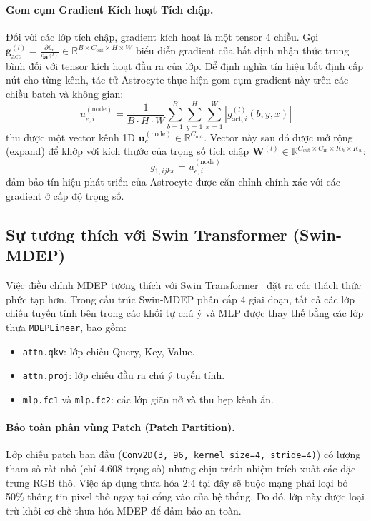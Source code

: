 \documentclass[11pt, a4paper]{article}
\newcommand{\R}{\mathbb{R}}
\begin{document}
\paragraph{Gom cụm Gradient Kích hoạt Tích chập.}
Đối với các lớp tích chập, gradient kích hoạt là một tensor 4 chiều. Gọi $\bm{g}_{\text{act}}^{(l)} = \frac{\partial \bar{u}_e}{\partial \bm{a}^{(l)}} \in \R^{B \times C_{\text{out}} \times H \times W}$ biểu diễn gradient của bất định nhận thức trung bình đối với tensor kích hoạt đầu ra của lớp. Để định nghĩa tín hiệu bất định cấp nút cho từng kênh, tác tử Astrocyte thực hiện gom cụm gradient này trên các chiều batch và không gian:
\begin{equation}\label{eq:conv_pooling}
    u_{e,i}^{(\text{node})} = \frac{1}{B \cdot H \cdot W} \sum_{b=1}^B \sum_{y=1}^H \sum_{x=1}^W \left| g_{\text{act}, i}^{(l)}(b, y, x) \right|
\end{equation}
thu được một vector kênh 1D $\bm{u}_e^{(\text{node})} \in \R^{C_{\text{out}}}$. Vector này sau đó được mở rộng (expand) để khớp với kích thước của trọng số tích chập $\bm{W}^{(l)} \in \R^{C_{\text{out}} \times C_{\text{in}} \times K_h \times K_w}$:
\begin{equation}
    g_{1, ijkx} = u_{e,i}^{(\text{node})}
\end{equation}
đảm bảo tín hiệu phát triển của Astrocyte được căn chỉnh chính xác với các gradient ở cấp độ trọng số.

\subsection{Sự tương thích với Swin Transformer (Swin-MDEP)}\label{subsec:swin}

Việc điều chỉnh MDEP tương thích với Swin Transformer~\cite{liu2021swin, liu2022swinv2} đặt ra các thách thức phức tạp hơn. Trong cấu trúc Swin-MDEP phân cấp 4 giai đoạn, tất cả các lớp chiếu tuyến tính bên trong các khối tự chú ý và MLP được thay thế bằng các lớp thưa \texttt{MDEPLinear}, bao gồm:
\begin{itemize}
    \item \texttt{attn.qkv}: lớp chiếu Query, Key, Value.
    \item \texttt{attn.proj}: lớp chiếu đầu ra chú ý tuyến tính.
    \item \texttt{mlp.fc1} và \texttt{mlp.fc2}: các lớp giãn nở và thu hẹp kênh ẩn.
\end{itemize}

\paragraph{Bảo toàn phân vùng Patch (Patch Partition).}
Lớp chiếu patch ban đầu (\texttt{Conv2D(3, 96, kernel\_size=4, stride=4)}) có lượng tham số rất nhỏ (chỉ 4.608 trọng số) nhưng chịu trách nhiệm trích xuất các đặc trưng RGB thô. Việc áp dụng thưa hóa 2:4 tại đây sẽ buộc mạng phải loại bỏ 50\% thông tin pixel thô ngay tại cổng vào của hệ thống. Do đó, lớp này được loại trừ khỏi cơ chế thưa hóa MDEP để đảm bảo an toàn.
\end{document}
